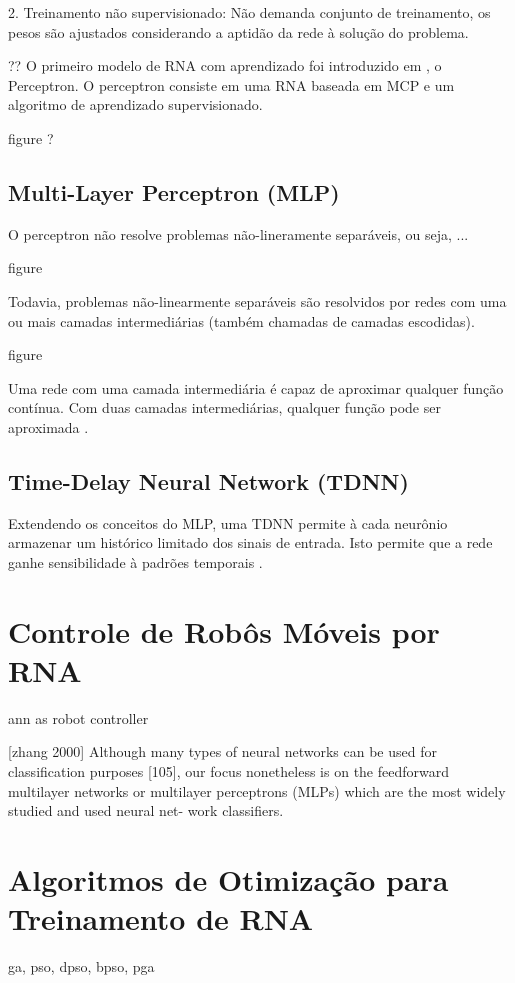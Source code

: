 2. Treinamento não supervisionado: Não demanda conjunto de treinamento, os pesos
são ajustados considerando a aptidão da rede à solução do problema.

?? O primeiro modelo de RNA com aprendizado foi introduzido em
\cite{rosenblatt58perceptron}, o Perceptron. O perceptron consiste em uma RNA
baseada em MCP e um algoritmo de aprendizado supervisionado.

figure ?

\subsection{Multi-Layer Perceptron (MLP)}

O perceptron não resolve problemas não-lineramente separáveis, ou seja, ...

figure

Todavia, problemas não-linearmente separáveis são resolvidos por redes com uma
ou mais camadas intermediárias (também chamadas de camadas escodidas).

figure

Uma rede com uma camada intermediária é capaz de aproximar qualquer função
contínua. Com duas camadas intermediárias, qualquer função pode ser aproximada
\cite{cybenko89mlp}.

\subsection{Time-Delay Neural Network (TDNN)}

Extendendo os conceitos do MLP, uma TDNN permite à cada neurônio armazenar um
histórico limitado dos sinais de entrada. Isto permite que a rede ganhe
sensibilidade à padrões temporais \cite{kaiser94tdnn}.

\section{Controle de Robôs Móveis por RNA}

ann as robot controller

[zhang 2000]
Although many types of neural networks can be used
for classification purposes [105], our focus nonetheless is on
the feedforward multilayer networks or multilayer perceptrons
(MLPs) which are the most widely studied and used neural net-
work classifiers.

\section{Algoritmos de Otimização para Treinamento de RNA}

ga, pso, dpso, bpso, pga